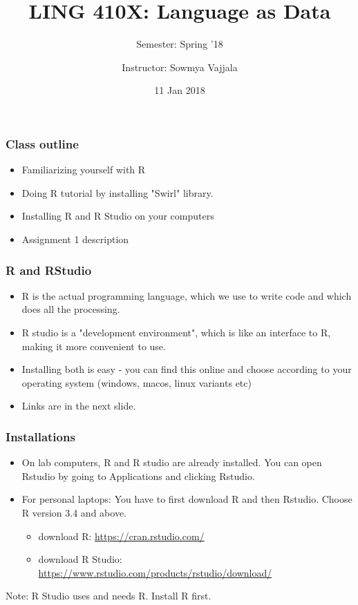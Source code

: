 \documentclass{beamer}
\author[Sowmya Vajjala]{Instructor: Sowmya Vajjala}
\title[LING 410X]{LING 410X: Language as Data}
\subtitle{Semester: Spring '18}
\date{11 Jan 2018}
\institute{Iowa State University, USA}
\begin{document}
\begin{frame}\titlepage
\end{frame}

\begin{frame}
\frametitle{Class outline}
\begin{itemize}
\item Familiarizing yourself with R
\item Doing R tutorial by installing "Swirl" library. 
\item Installing R and R Studio on your computers
\item Assignment 1 description
\end{itemize}
\end{frame}

\begin{frame}
\frametitle{R and RStudio}
\begin{itemize}
\item R is the actual programming language, which we use to write code and which does all the processing.
\item R studio is a "development environment", which is like an interface to R, making it more convenient to use.
\item Installing both is easy - you can find this online and choose according to your operating system (windows, macos, linux variants etc)
\item Links are in the next slide. 
\end{itemize}
\end{frame}

\begin{frame}
\frametitle{Installations}
\begin{itemize}
\item On lab computers, R and R studio are already installed. You can open Rstudio by going to Applications and clicking Rstudio.
\item For personal laptops: You have to first download R and then Rstudio. Choose R version 3.4 and above.
\begin{itemize}
\item download R: \url{https://cran.rstudio.com/}
\item download R Studio: \url{https://www.rstudio.com/products/rstudio/download/}
\end{itemize}
\end{itemize}
Note: R Studio uses and needs R. Install R first. 
\end{frame}
\end{document}
